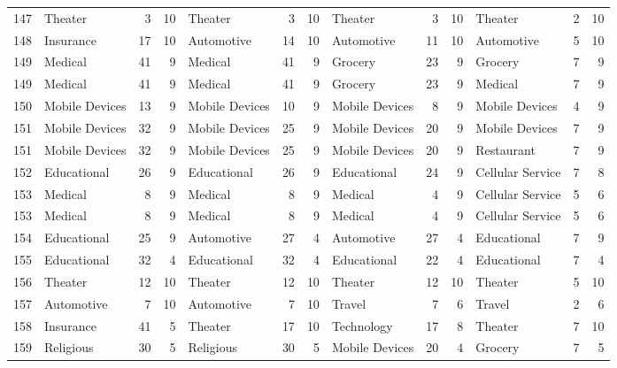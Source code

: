 \begin{figure}[htbp]
\begin{tabular}{rlrrlrrlrrlrr}
    147   & Theater & 3     & 10    & Theater & 3     & 10    & Theater & 3     & 10    & Theater & 2     & 10 \\
    148   & Insurance & 17    & 10    & Automotive & 14    & 10    & Automotive & 11    & 10    & Automotive & 5     & 10 \\
    149   & Medical & 41    & 9     & Medical & 41    & 9     & Grocery & 23    & 9     & Grocery & 7     & 9 \\
    149   & Medical & 41    & 9     & Medical & 41    & 9     & Grocery & 23    & 9     & Medical & 7     & 9 \\
    150   & Mobile Devices & 13    & 9     & Mobile Devices & 10    & 9     & Mobile Devices & 8     & 9     & Mobile Devices & 4     & 9 \\
    151   & Mobile Devices & 32    & 9     & Mobile Devices & 25    & 9     & Mobile Devices & 20    & 9     & Mobile Devices & 7     & 9 \\
    151   & Mobile Devices & 32    & 9     & Mobile Devices & 25    & 9     & Mobile Devices & 20    & 9     & Restaurant & 7     & 9 \\
    152   & Educational & 26    & 9     & Educational & 26    & 9     & Educational & 24    & 9     & Cellular Service & 7     & 8 \\
    153   & Medical & 8     & 9     & Medical & 8     & 9     & Medical & 4     & 9     & Cellular Service & 5     & 6 \\
    153   & Medical & 8     & 9     & Medical & 8     & 9     & Medical & 4     & 9     & Cellular Service & 5     & 6 \\
    154   & Educational & 25    & 9     & Automotive & 27    & 4     & Automotive & 27    & 4     & Educational & 7     & 9 \\
    155   & Educational & 32    & 4     & Educational & 32    & 4     & Educational & 22    & 4     & Educational & 7     & 4 \\
    156   & Theater & 12    & 10    & Theater & 12    & 10    & Theater & 12    & 10    & Theater & 5     & 10 \\
    157   & Automotive & 7     & 10    & Automotive & 7     & 10    & Travel & 7     & 6     & Travel & 2     & 6 \\
    158   & Insurance & 41    & 5     & Theater & 17    & 10    & Technology & 17    & 8     & Theater & 7     & 10 \\
    159   & Religious & 30    & 5     & Religious & 30    & 5     & Mobile Devices & 20    & 4     & Grocery & 7     & 5 \\

\end{tabular}
\end{figure}
